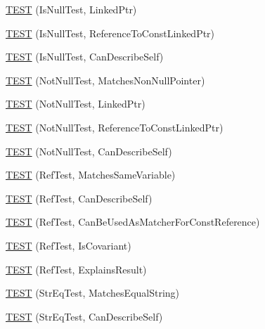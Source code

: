 \begin{DoxyCompactItemize}
\item 
\mbox{\hyperlink{namespacetesting_1_1gmock__matchers__test_a0b1655e1640b7da6e1e7cc35074d9274}{T\+E\+ST}} (Is\+Null\+Test, Linked\+Ptr)
\item 
\mbox{\hyperlink{namespacetesting_1_1gmock__matchers__test_afaaf0776096c0ad62de8236ab1b774d7}{T\+E\+ST}} (Is\+Null\+Test, Reference\+To\+Const\+Linked\+Ptr)
\item 
\mbox{\hyperlink{namespacetesting_1_1gmock__matchers__test_a5ba91e0b79fcc0b17b1c1e373e741c38}{T\+E\+ST}} (Is\+Null\+Test, Can\+Describe\+Self)
\item 
\mbox{\hyperlink{namespacetesting_1_1gmock__matchers__test_a694ea33511eab7822b88d8e74b388534}{T\+E\+ST}} (Not\+Null\+Test, Matches\+Non\+Null\+Pointer)
\item 
\mbox{\hyperlink{namespacetesting_1_1gmock__matchers__test_aec956599ef91df968fec972247c7a28a}{T\+E\+ST}} (Not\+Null\+Test, Linked\+Ptr)
\item 
\mbox{\hyperlink{namespacetesting_1_1gmock__matchers__test_a9e9560feb52f60475f653c15cc7466aa}{T\+E\+ST}} (Not\+Null\+Test, Reference\+To\+Const\+Linked\+Ptr)
\item 
\mbox{\hyperlink{namespacetesting_1_1gmock__matchers__test_a68da7653e6a480c60a3a03fe8afb20fc}{T\+E\+ST}} (Not\+Null\+Test, Can\+Describe\+Self)
\item 
\mbox{\hyperlink{namespacetesting_1_1gmock__matchers__test_a199983108927dadee9bd2e03ddd6057d}{T\+E\+ST}} (Ref\+Test, Matches\+Same\+Variable)
\item 
\mbox{\hyperlink{namespacetesting_1_1gmock__matchers__test_ad8fc5a82cbb4b5b8147798be06d7059b}{T\+E\+ST}} (Ref\+Test, Can\+Describe\+Self)
\item 
\mbox{\hyperlink{namespacetesting_1_1gmock__matchers__test_af1e64d057f2c46cc17f1c96a075cde6b}{T\+E\+ST}} (Ref\+Test, Can\+Be\+Used\+As\+Matcher\+For\+Const\+Reference)
\item 
\mbox{\hyperlink{namespacetesting_1_1gmock__matchers__test_a03b45cf0f65f33208ac378b8603ff67a}{T\+E\+ST}} (Ref\+Test, Is\+Covariant)
\item 
\mbox{\hyperlink{namespacetesting_1_1gmock__matchers__test_ab73595bcf8dd511b519b640248136ccd}{T\+E\+ST}} (Ref\+Test, Explains\+Result)
\item 
\mbox{\hyperlink{namespacetesting_1_1gmock__matchers__test_a5956b46686ad29d2d29b313bce9eba8a}{T\+E\+ST}} (Str\+Eq\+Test, Matches\+Equal\+String)
\item 
\mbox{\hyperlink{namespacetesting_1_1gmock__matchers__test_a1cb9d74bdf937816807e91b842b22c75}{T\+E\+ST}} (Str\+Eq\+Test, Can\+Describe\+Self)

\end{DoxyCompactItemize}

